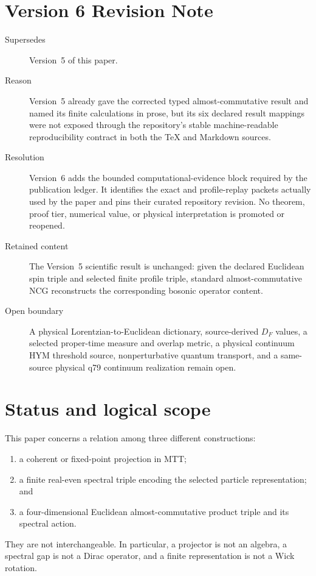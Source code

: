 \documentclass[11pt,a4paper,twoside]{article}
\theoremstyle{plain}
\theoremstyle{definition}
\theoremstyle{remark}
\newcommand{\DF}{D_{F}}
\begin{document}
\section*{Version 6 Revision Note}
\begin{description}
\item[Supersedes]
Version~5 of this paper.

\item[Reason]
Version~5 already gave the corrected typed almost-commutative result and
named its finite calculations in prose, but its six declared result mappings
were not exposed through the repository's stable machine-readable
reproducibility contract in both the TeX and Markdown sources.

\item[Resolution]
Version~6 adds the bounded computational-evidence block required by the
publication ledger.  It identifies the exact and profile-replay packets
actually used by the paper and pins their curated repository revision.  No
theorem, proof tier, numerical value, or physical interpretation is promoted
or reopened.

\item[Retained content]
The Version~5 scientific result is unchanged: given the declared Euclidean
spin triple and selected finite profile triple, standard
almost-commutative NCG reconstructs the corresponding bosonic operator
content.

\item[Open boundary]
A physical Lorentzian-to-Euclidean dictionary,
source-derived $\DF$ values, a selected proper-time measure and overlap
metric, a physical continuum HYM threshold source, nonperturbative quantum
transport, and a same-source physical q79 continuum realization remain open.
\end{description}

\tableofcontents
\newpage

\section{Status and logical scope}

This paper concerns a relation among three different constructions:
\begin{enumerate}
\item a coherent or fixed-point projection in MTT;
\item a finite real-even spectral triple encoding the selected particle
      representation; and
\item a four-dimensional Euclidean almost-commutative product triple and its
      spectral action.
\end{enumerate}
They are not interchangeable.  In particular, a projector is not an algebra,
a spectral gap is not a Dirac operator, and a finite representation is not a
Wick rotation.
\end{document}
